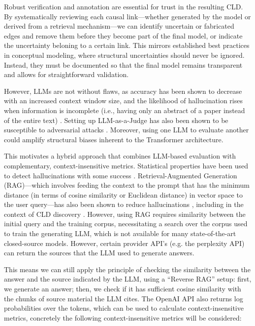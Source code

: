Robust verification and annotation are essential for trust in the resulting CLD. By systematically reviewing each causal link—whether generated by the model or derived from a retrieval mechanism—we can identify uncertain or fabricated edges and remove them before they become part of the final model, or indicate the uncertainty beloning to a certain link. This mirrors established best practices in conceptual modeling, where structural uncertainties should never be ignored. Instead, they must be documented so that the final model remains transparent and allows for straightforward validation.

However, LLMs are not without flaws, as accuracy has been shown to decrease with an increased context window size, and the likelihood of hallucination rises when information is incomplete (i.e., having only an abstract of a paper instead of the entire text) \cite{Wang2024}. Setting up LLM-as-a-Judge has also been shown to be susceptible to adversarial attacks \cite{shi2024optimization, li2024llms}. Moreover, using one LLM to evaluate another could amplify structural biases inherent to the Transformer architecture.

This motivates a hybrid approach that combines LLM-based evaluation with complementary, context-insensitive metrics. Statistical properties have been used to detect hallucinations with some success \cite{varshney2023stitch, farquhar2024detecting}. Retrieval-Augmented Generation (RAG)—which involves feeding the context to the prompt that has the minimum distance (in terms of cosine similarity or Euclidean distance) in vector space to the user query—has also been shown to reduce hallucinations \cite{lewis2020retrieval}, including in the context of CLD discovery \cite{zhang2024causal}. However, using RAG requires similarity between the initial query and the training corpus, necessitating a search over the corpus used to train the generating LLM, which is not available for many state-of-the-art closed-source models.  However, certain provider API's (e.g. the perplexity API) can return the sources that the LLM used to generate answers. 

This means we can still apply the principle of checking the similarity between the answer and the source indicated by the LLM, using a “Reverse RAG” setup: first, we generate an answer; then, we check if it has sufficient cosine similarity with the chunks of source material the LLM cites. The OpenAI API also returns log probabilities over the tokens, which can be used to calculate context-insensitive metrics, concretely the following context-insensitive metrics will be considered: 

